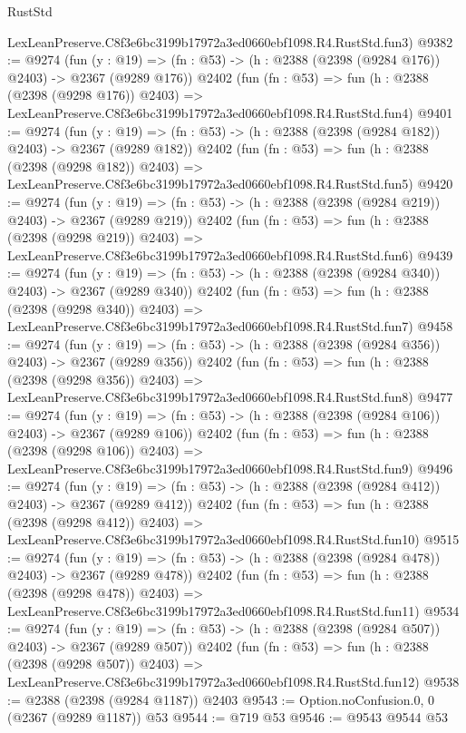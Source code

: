 \begin{lexlean}{RustStd}
\begin{coremodule}
    LexLeanPreserve.C8f3e6bc3199b17972a3ed0660ebf1098.R4.RustStd.fun3)
@9382 := @9274
    (fun (y : @19) => (fn : @53) -> (h : @2388 (@2398 (@9284 @176)) @2403) -> @2367 (@9289 @176))
    @2402
    (fun (fn : @53) =>
    fun (h : @2388 (@2398 (@9298 @176)) @2403) =>
    LexLeanPreserve.C8f3e6bc3199b17972a3ed0660ebf1098.R4.RustStd.fun4)
@9401 := @9274
    (fun (y : @19) => (fn : @53) -> (h : @2388 (@2398 (@9284 @182)) @2403) -> @2367 (@9289 @182))
    @2402
    (fun (fn : @53) =>
    fun (h : @2388 (@2398 (@9298 @182)) @2403) =>
    LexLeanPreserve.C8f3e6bc3199b17972a3ed0660ebf1098.R4.RustStd.fun5)
@9420 := @9274
    (fun (y : @19) => (fn : @53) -> (h : @2388 (@2398 (@9284 @219)) @2403) -> @2367 (@9289 @219))
    @2402
    (fun (fn : @53) =>
    fun (h : @2388 (@2398 (@9298 @219)) @2403) =>
    LexLeanPreserve.C8f3e6bc3199b17972a3ed0660ebf1098.R4.RustStd.fun6)
@9439 := @9274
    (fun (y : @19) => (fn : @53) -> (h : @2388 (@2398 (@9284 @340)) @2403) -> @2367 (@9289 @340))
    @2402
    (fun (fn : @53) =>
    fun (h : @2388 (@2398 (@9298 @340)) @2403) =>
    LexLeanPreserve.C8f3e6bc3199b17972a3ed0660ebf1098.R4.RustStd.fun7)
@9458 := @9274
    (fun (y : @19) => (fn : @53) -> (h : @2388 (@2398 (@9284 @356)) @2403) -> @2367 (@9289 @356))
    @2402
    (fun (fn : @53) =>
    fun (h : @2388 (@2398 (@9298 @356)) @2403) =>
    LexLeanPreserve.C8f3e6bc3199b17972a3ed0660ebf1098.R4.RustStd.fun8)
@9477 := @9274
    (fun (y : @19) => (fn : @53) -> (h : @2388 (@2398 (@9284 @106)) @2403) -> @2367 (@9289 @106))
    @2402
    (fun (fn : @53) =>
    fun (h : @2388 (@2398 (@9298 @106)) @2403) =>
    LexLeanPreserve.C8f3e6bc3199b17972a3ed0660ebf1098.R4.RustStd.fun9)
@9496 := @9274
    (fun (y : @19) => (fn : @53) -> (h : @2388 (@2398 (@9284 @412)) @2403) -> @2367 (@9289 @412))
    @2402
    (fun (fn : @53) =>
    fun (h : @2388 (@2398 (@9298 @412)) @2403) =>
    LexLeanPreserve.C8f3e6bc3199b17972a3ed0660ebf1098.R4.RustStd.fun10)
@9515 := @9274
    (fun (y : @19) => (fn : @53) -> (h : @2388 (@2398 (@9284 @478)) @2403) -> @2367 (@9289 @478))
    @2402
    (fun (fn : @53) =>
    fun (h : @2388 (@2398 (@9298 @478)) @2403) =>
    LexLeanPreserve.C8f3e6bc3199b17972a3ed0660ebf1098.R4.RustStd.fun11)
@9534 := @9274
    (fun (y : @19) => (fn : @53) -> (h : @2388 (@2398 (@9284 @507)) @2403) -> @2367 (@9289 @507))
    @2402
    (fun (fn : @53) =>
    fun (h : @2388 (@2398 (@9298 @507)) @2403) =>
    LexLeanPreserve.C8f3e6bc3199b17972a3ed0660ebf1098.R4.RustStd.fun12)
@9538 := @2388 (@2398 (@9284 @1187)) @2403
@9543 := Option.noConfusion.{0, 0} (@2367 (@9289 @1187)) @53
@9544 := @719 @53
@9546 := @9543 @9544 @53

\end{coremodule}
\end{lexlean}
